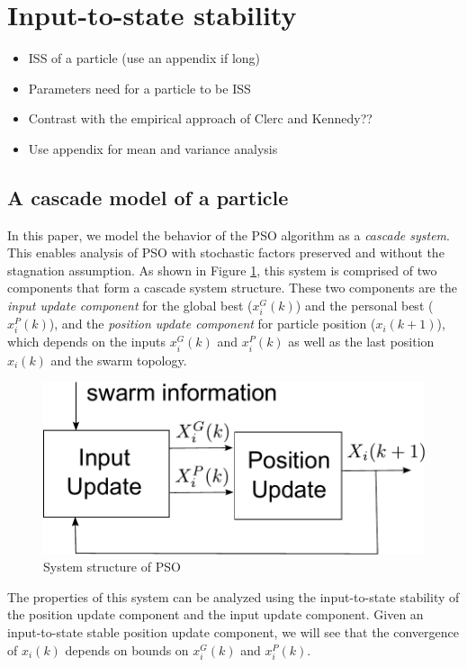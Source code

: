 \section{Input-to-state stability}
\label{sec:iss}

\begin{itemize}
\item ISS of a particle (use an appendix if long)
\item Parameters need for a particle to be ISS
\item Contrast with the empirical approach of Clerc and Kennedy??
\item Use appendix for mean and variance analysis
\end{itemize}

\subsection{A cascade model of a particle}

In this paper, we model the behavior of the PSO algorithm as a \emph{cascade system}.
This enables analysis of PSO with stochastic factors preserved and without the stagnation assumption.
As shown in Figure \ref{fig:sys_flow}, this system is comprised of two components that form a
cascade system structure.
These two components are the 
\emph{input update component} for the global best ($ x^{G}_{i}(k) $) and the personal best ($ x^{P}_{i}(k) $), and the 
\emph{position update component} for particle position ($ x_{i}(k+1) $), which depends on the inputs $ x^{G}_{i}(k) $ and $ x^{P}_{i}(k) $ as well as the last position $ x_{i}(k) $ and the swarm topology.

\begin{figure}
\centering
\includegraphics[width=0.7\linewidth]{./fig/sys_flow.pdf}
\caption{System structure of PSO}
\label{fig:sys_flow}
\end{figure}

The properties of this system can be analyzed using the input-to-state stability of the position update component and the input update component. 
Given an input-to-state stable position update component, we will see that the convergence of $ x_{i}(k) $ depends on bounds on $ x^{G}_{i}(k) $ and $ x^{P}_{i}(k) $.

